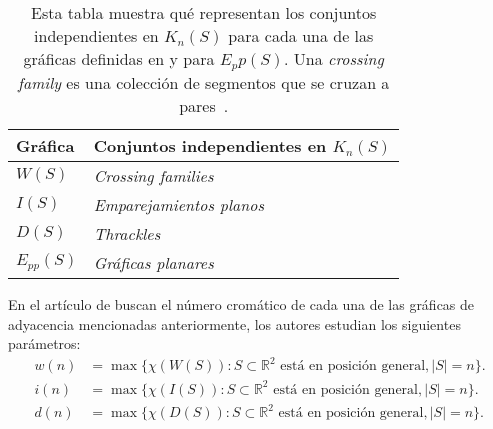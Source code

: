 %
\begin{table}
  \centering
  \begin{tabular}{|l|l|}
    \hline
    Gráfica   & Conjuntos independientes en $K_n(S)$    \\ \hline \hline
    $W(S)$    & \emph{Crossing families}        \\ \hline
    $I(S)$    & \emph{Emparejamientos planos}           \\ \hline
    $D(S)$    & \emph{Thrackles}                        \\ \hline
    $E_{pp}(S)$ & \emph{Gráficas planares}                   \\ \hline
  \end{tabular}
  \caption{Esta tabla muestra qué representan los conjuntos independientes en
  $K_n(S)$ para cada una de las gráficas definidas en \cite{Araujo2005} y para
  $E_pp(S)$. Una \emph{crossing family} es una colección de segmentos
  que se cruzan a pares~\cite{Lara2019}. }
  \label{table:graficasincidencia}
\end{table}
En el artículo de \cite{Araujo2005} buscan el número cromático de cada una de
las gráficas de adyacencia mencionadas anteriormente, los autores estudian los
siguientes parámetros:
  \begin{align*}
    w(n) &= \max\{\chi(W(S)): S\subset \mathbb{R}^2 \text{ está en posición general}, |S|=n\}. \\
    i(n) &= \max\{\chi(I(S)): S\subset \mathbb{R}^2 \text{ está en posición general}, |S|=n\}. \\
    d(n) &= \max\{\chi(D(S)): S\subset \mathbb{R}^2 \text{ está en posición general}, |S|=n\}. \\
  \end{align*}
